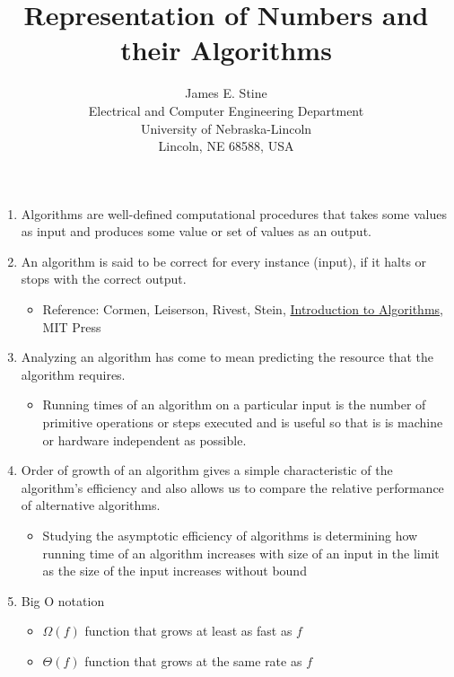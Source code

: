 \documentclass[times, twocolumn, 10pt]{article}
\begin{document}
\title{Representation of Numbers and their Algorithms}
\author{James E. Stine \\
Electrical and Computer Engineering Department\\
University of Nebraska-Lincoln \\
Lincoln, NE 68588, USA}
\date{}

\maketitle
\begin{enumerate}
\item Algorithms are well-defined computational procedures that takes
  some values as input and produces some value or set of values as an
  output.
\item An algorithm is said to be correct for every instance (input),
  if it halts or stops with the correct output.
  \begin{itemize}
  \item Reference: Cormen, Leiserson, Rivest, Stein,
    \underline{Introduction to Algorithms}, MIT Press
  \end{itemize}
\item Analyzing an algorithm has come to mean predicting the resource
  that the algorithm requires.
  \begin{itemize}
  \item Running times of an algorithm on a particular input is the
    number of primitive operations or steps executed and is useful so
    that is is machine or hardware independent as possible.
  \end{itemize}
\item Order of growth of an algorithm gives a simple characteristic of
  the algorithm's efficiency and also allows us to compare the
  relative performance of alternative algorithms.
  \begin{itemize}
  \item Studying the asymptotic efficiency of algorithms is determining
    how running time of an algorithm increases with size of an input in
    the limit as the size of the input increases without bound
  \end{itemize}
\item Big O notation
  \begin{itemize}
  \item $\Omega(f)$ function that grows at least as fast as $f$
  \item $\Theta(f)$ function that grows at the same rate as $f$

\end{itemize}
\end{enumerate}
\end{document}
